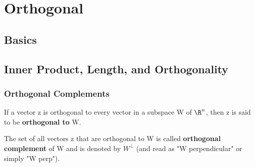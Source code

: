 \chapter{Orthogonal}

\section{Basics}



\section{Inner Product, Length, and Orthogonality}

\subsection{Orthogonal Complements}

\begin{definition}

    If a vector z is orthogonal to every vector in a subspace W of \(\R^n\), then z is said to be \textbf{orthogonal to} W. 
    
    The set of all vectors z that are orthogonal to W is called \textbf{orthogonal complement} of W and is denoted by \(W^{\perp}\) (and read as "W perpendicular" or simply "W perp").   
\end{definition}


